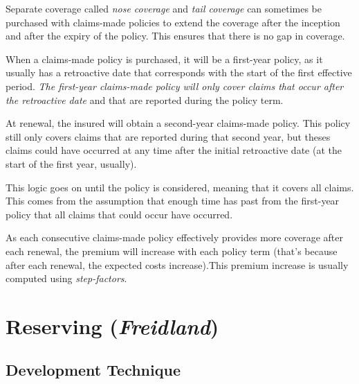 \documentclass[11pt, english]{memoir}
\numberwithin{definition}{section}
\begin{document}
Separate coverage called \emph{nose coverage} and \emph{tail coverage} can sometimes be purchased with claims-made policies to extend the coverage after the inception and after the expiry of the policy. This ensures that there is no gap in coverage. 

When a claims-made policy is purchased, it will be a first-year policy, as it usually has a retroactive date that corresponds with the start of the first effective period. \emph{The first-year claims-made policy will only cover claims that occur after the retroactive date} and that are reported during the policy term. 

At renewal, the insured will obtain a second-year claims-made policy. This policy still only covers claims that are reported during that second year, but theses claims could have occurred at any time after the initial retroactive date (at the start of the first year, usually). 

This logic goes on until the policy is considered, meaning that it covers all claims. This comes from the assumption that enough time has past from the first-year policy that all claims that could occur have occurred. 


As each consecutive claims-made policy effectively provides more coverage after each renewal, the premium will increase with each policy term (that's because after each renewal, the expected costs increase).This premium increase is usually computed using \emph{step-factors}. 































\part{Reserving (\emph{Freidland})}
	





\chapter{Development Technique}
\end{document}
